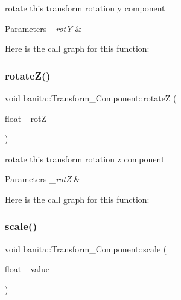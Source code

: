 rotate this transform rotation y component 


\begin{DoxyParams}{Parameters}
{\em \+\_\+rotY} & \\
\hline
\end{DoxyParams}
Here is the call graph for this function\+:
\mbox{\label{classbanita_1_1_transform___component_a36eeb4e9eb4d7dfd3fc2e07f650ea70c}} 
\subsubsection{\texorpdfstring{rotateZ()}{rotateZ()}}
{\footnotesize\ttfamily void banita\+::\+Transform\+\_\+\+Component\+::rotateZ (\begin{DoxyParamCaption}\item[{float}]{\+\_\+rotZ }\end{DoxyParamCaption})\hspace{0.3cm}{\ttfamily [inline]}}



rotate this transform rotation z component 


\begin{DoxyParams}{Parameters}
{\em \+\_\+rotZ} & \\
\hline
\end{DoxyParams}
Here is the call graph for this function\+:
\mbox{\label{classbanita_1_1_transform___component_a83cc2d972d98fdcff1be55f9f5448df3}} 
\subsubsection{\texorpdfstring{scale()}{scale()}}
{\footnotesize\ttfamily void banita\+::\+Transform\+\_\+\+Component\+::scale (\begin{DoxyParamCaption}\item[{float}]{\+\_\+value }\end{DoxyParamCaption})\hspace{0.3cm}{\ttfamily [inline]}}



